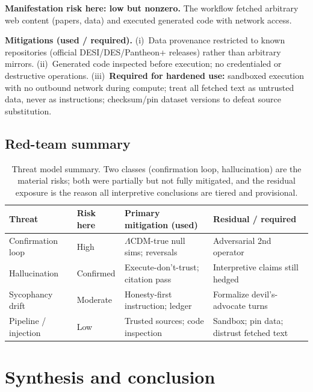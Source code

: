 \documentclass[11pt]{article}
\newcommand{\LCDM}{$\Lambda$CDM}
\begin{document}
\textbf{Manifestation risk here: low but nonzero.} The workflow fetched arbitrary web content (papers, data) and executed generated code with network access.

\textbf{Mitigations (used / required).} (i)~Data provenance restricted to known repositories (official DESI/DES/Pantheon+ releases) rather than arbitrary mirrors. (ii)~Generated code inspected before execution; no credentialed or destructive operations. (iii)~\textbf{Required for hardened use:} sandboxed execution with no outbound network during compute; treat all fetched text as untrusted data, never as instructions; checksum/pin dataset versions to defeat source substitution.

\subsection{Red-team summary}
\begin{table}[h]
\centering
\small
\begin{tabular}{@{}p{3.4cm}p{1.6cm}p{4.0cm}p{4.0cm}@{}}
\toprule
\textbf{Threat} & \textbf{Risk here} & \textbf{Primary mitigation (used)} & \textbf{Residual / required} \\
\midrule
Confirmation loop & High & \LCDM-true null sims; reversals & Adversarial 2nd operator \\
Hallucination & Confirmed & Execute-don't-trust; citation pass & Interpretive claims still hedged \\
Sycophancy drift & Moderate & Honesty-first instruction; ledger & Formalize devil's-advocate turns \\
Pipeline / injection & Low & Trusted sources; code inspection & Sandbox; pin data; distrust fetched text \\
\bottomrule
\end{tabular}
\caption{Threat model summary. Two classes (confirmation loop, hallucination) are the material risks; both were partially but not fully mitigated, and the residual exposure is the reason all interpretive conclusions are tiered and provisional.}
\label{tab:threats}
\end{table}

\section{Synthesis and conclusion}
\end{document}
